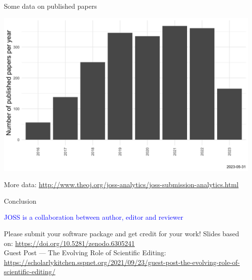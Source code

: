 \begin{frame}{Some data on published papers}

\includegraphics[width=\linewidth]{papers-per-year.png}



{\tiny More data: \url{http://www.theoj.org/joss-analytics/joss-submission-analytics.html}}    
\end{frame}


\begin{frame}{Conclusion}

\begin{center}
\Large \textcolor{blue}{JOSS is a collaboration
between author, editor and
reviewer}
\end{center}
\vspace{1cm}
Please submit your software package and get credit for your work!
\vspace{1cm}
{\tiny Slides based on: \url{https://doi.org/10.5281/zenodo.6305241}\\
Guest Post — The Evolving Role of Scientific Editing: \url{https://scholarlykitchen.sspnet.org/2021/09/23/guest-post-the-evolving-role-of-scientific-editing/}}
    
\end{frame}